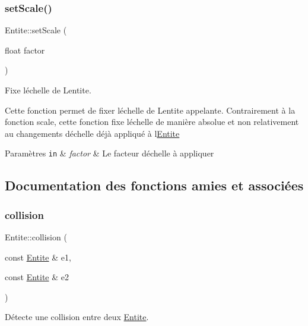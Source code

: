 \subsubsection{\texorpdfstring{set\+Scale()}{setScale()}}
{\footnotesize\ttfamily Entite\+::set\+Scale (\begin{DoxyParamCaption}\item[{float}]{factor }\end{DoxyParamCaption})}



Fixe l\textquotesingle{}échelle de L\textquotesingle{}entite. 

Cette fonction permet de fixer l\textquotesingle{}échelle de L\textquotesingle{}entite appelante. Contrairement à la fonction scale, cette fonction fixe l\textquotesingle{}échelle de manière absolue et non relativement au changements d\textquotesingle{}échelle déjà appliqué à l\textquotesingle{}\hyperlink{class_entite}{Entite} 
\begin{DoxyParams}[1]{Paramètres}
\mbox{\tt in}  & {\em factor} & Le facteur d\textquotesingle{}échelle à appliquer \\
\hline
\end{DoxyParams}


\subsection{Documentation des fonctions amies et associées}
\mbox{\label{class_entite_ac5011435e5099909dd34cd1750933b30}} 
\subsubsection{\texorpdfstring{collision}{collision}}
{\footnotesize\ttfamily Entite\+::collision (\begin{DoxyParamCaption}\item[{const \hyperlink{class_entite}{Entite} \&}]{e1,  }\item[{const \hyperlink{class_entite}{Entite} \&}]{e2 }\end{DoxyParamCaption})\hspace{0.3cm}{\ttfamily [friend]}}



Détecte une collision entre deux \hyperlink{class_entite}{Entite}. 

